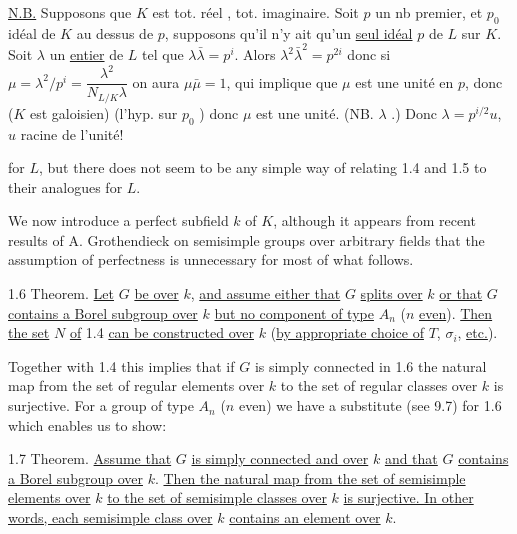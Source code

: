 \uline{N.B.} Supposons que $K$ est tot. réel ,    tot. imaginaire. Soit $p$ un nb premier, et $p_0$ idéal de $K$ au dessus de $p$, supposons qu'il n'y ait qu'un \uline{seul idéal}  $p$  de $L$ sur $K$. Soit $\lambda$ un \uline{entier} de $L$ tel que $\lambda\bar\lambda=p^i$. Alors $\lambda^2\bar\lambda^2=p^{2i}$ donc si $\mu=\lambda^2/p^i=\dfrac{\lambda^2}{N_{L/K}\lambda}$ on aura $\mu\bar\mu=1$,  qui implique que $\mu$ est une unité en $p$, donc ($K$ est galoisien)  (l'hyp. sur $p_0$ ) donc $\mu$ est une unité. (NB. $\lambda$ .) Donc $\lambda=p^{i/2}u$, $u$ racine de l'unité!



for $L$, but there does not seem to be any simple way of relating 1.4 and 1.5 to their analogues for $L$.

We now introduce a perfect subfield $k$ of $K$, although it appears from recent results of A. Grothendieck on semisimple groups over arbitrary fields that the assumption of perfectness is unnecessary for most of what follows.

1.6 Theorem. \uline{Let} $G$ \uline{be over} $k$, \uline{and assume either that} $G$ \uline{splits over} $k$ \uline{or that} $G$ \uline{contains a Borel subgroup over} $k$ \uline{but no component of type} $A_n$ ($n$ \uline{even}). \uline{Then the set} $N$ \uline{of} 1.4 \uline{can be constructed over} $k$ (\uline{by appropriate choice of} $T$, $\sigma_i$, \uline{etc.}).

Together with 1.4 this implies that if $G$ is simply connected in 1.6 the natural map from the set of regular elements over $k$ to the set of regular classes over $k$ is surjective. For a group of type $A_n$ ($n$ even) we have a substitute (see 9.7) for 1.6 which enables us to show:

1.7 Theorem. \uline{Assume that} $G$ \uline{is simply connected and over} $k$ \uline{and that} $G$ \uline{contains a Borel subgroup over} $k$. \uline{Then the natural map from the set of semisimple elements over} $k$ \uline{to the set of semisimple classes over} $k$ \uline{is surjective. In other words, each semisimple class over} $k$ \uline{contains an element over} $k$.

